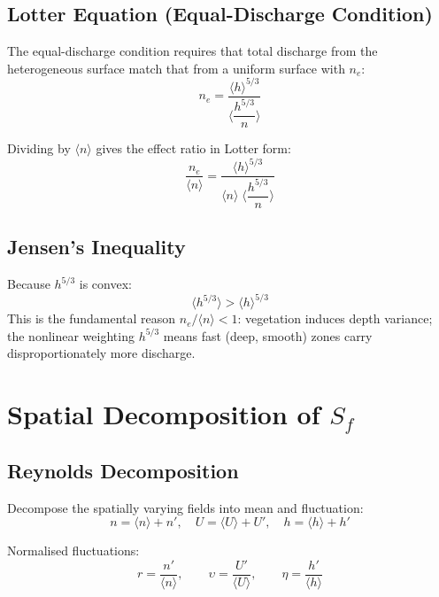 \documentclass[11pt]{article}
\newcommand{\avg}[1]{\langle #1 \rangle}
\newcommand{\neff}{n_e}
\newcommand{\Sf}{S_f}
\begin{document}
\subsection{Lotter Equation (Equal-Discharge Condition)}

The equal-discharge condition requires that total discharge from the heterogeneous surface match that from a uniform surface with $\neff$:
\begin{equation}\label{eq:lotter}
  \neff = \frac{\avg{h}^{5/3}}{\avg{\dfrac{h^{5/3}}{n}}}
\end{equation}

Dividing by $\avg{n}$ gives the effect ratio in Lotter form:
\begin{equation}\label{eq:lotter-ratio}
  \frac{\neff}{\avg{n}}
  = \frac{\avg{h}^{5/3}}{\avg{n}\;\avg{\dfrac{h^{5/3}}{n}}}
\end{equation}

\subsection{Jensen's Inequality}

Because $h^{5/3}$ is convex:
\begin{equation}\label{eq:jensen}
  \avg{h^{5/3}} > \avg{h}^{5/3}
\end{equation}
This is the fundamental reason $\neff/\avg{n} < 1$: vegetation induces depth variance; the nonlinear weighting $h^{5/3}$ means fast (deep, smooth) zones carry disproportionately more discharge.


\section{Spatial Decomposition of $\Sf$}

\subsection{Reynolds Decomposition}

Decompose the spatially varying fields into mean and fluctuation:
\begin{equation}
  n = \avg{n} + n', \quad
  U = \avg{U} + U', \quad
  h = \avg{h} + h'
\end{equation}

Normalised fluctuations:
\begin{equation}
  r = \frac{n'}{\avg{n}}, \qquad
  \upsilon = \frac{U'}{\avg{U}}, \qquad
  \eta = \frac{h'}{\avg{h}}
\end{equation}
\end{document}
